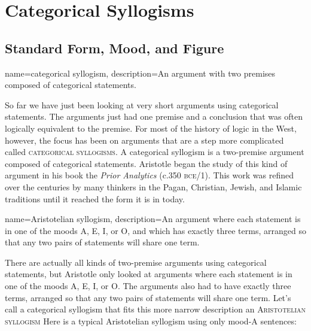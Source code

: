 \chapter{Categorical Syllogisms}
\label{chap:cat_syllogisms}
\setlength{\parindent}{1em}



\section{Standard Form, Mood, and Figure}
\label{sec:form_mood_figure}
{
name=categorical syllogism,
description={An argument with two premises composed of categorical statements.}
}


So far we have just been looking at very short arguments using categorical statements. The arguments just had one premise and a conclusion that was often logically equivalent to the premise. For most of the history of logic in the West, however, the focus has been on arguments that are a step more complicated called \textsc{\glspl{categorical syllogism}}. A categorical syllogism is a two-premise argument composed of categorical statements. Aristotle began the study of this kind of argument in his book the \textit{Prior Analytics} (c.350 \textsc{bce}/1\citeyear{Aristotle1984b}). This work was refined over the centuries by many thinkers in the Pagan, Christian, Jewish, and Islamic traditions until it reached the form it is in today.

{
name=Aristotelian syllogism,
description={An argument where each statement is in one of the moods A, E, I, or O, and which has exactly three terms, arranged so that any two pairs of statements will share one term.}
}


There are actually all kinds of two-premise arguments using categorical statements, but Aristotle only looked at arguments where each statement is in one of the moods A, E, I, or O. The arguments also had to have exactly three terms, arranged so that any two pairs of statements will share one term. Let's call a categorical syllogism that fits this more narrow description an \textsc{\gls{Aristotelian syllogism}} Here is a typical Aristotelian syllogism using only mood-A sentences:

